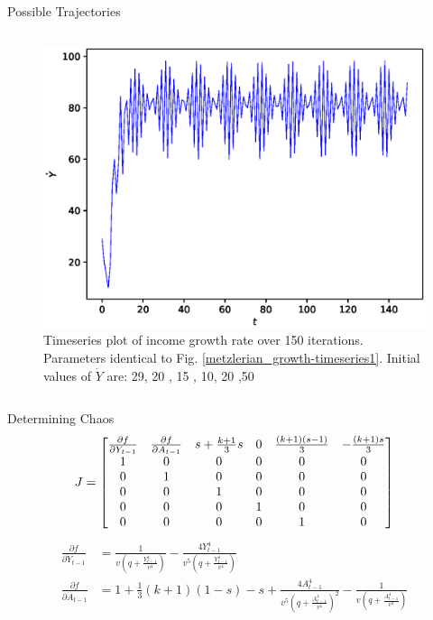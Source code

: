 \documentclass{beamer}
\begin{document}
\begin{frame}{Possible Trajectories}
\begin{columns}
\begin{column}{0.5\textwidth}
\begin{figure}
			\includegraphics[width=1.0\textwidth]{timeseries3.eps}
			\caption{Timeseries plot of income growth rate over 150 iterations. Parameters identical to Fig. \ref{metzlerian_growth-timeseries1}. Initial values of $\dot Y$ are: 29, 20 , 15 , 10, 20 ,50}
		\end{figure}
	\end{column}
	\end{columns}
\end{frame}

\begin{frame}{Determining Chaos}
	\begin{equation*}
		J=
		\begin{bmatrix}\small
			\frac{\partial f}{\partial Y_{t-1}} & \frac{\partial f}{\partial A_{t-1}} & s+\frac{k+1}{3}s & 0 & \frac{(k+1)(s-1)}{3} & -\frac{(k+1)s}{3}\\
			1 & 0 & 0 & 0 & 0 & 0\\
			0 & 1 & 0 & 0 & 0 & 0\\
			0 & 0 & 1 & 0 & 0 & 0\\
			0 & 0 & 0 & 1 & 0 & 0\\
			0 & 0 & 0 & 0 & 1 & 0
		\end{bmatrix}
	\end{equation*}
	\begin{align*}
		\frac{\partial f}{\partial \dot Y_{t-1}}&= \frac{1}{v\left(q+\frac{Y_{t-1}^4}{v^4}\right)}-\frac{4Y_{t-1}^4}{v^5\left(q+\frac{Y_{t-1}^4}{v^4}\right)}\\
		\frac{\partial f}{\partial \dot A_{t-1}}&=1+\frac{1}{3}(k+1)(1-s)-s+\frac{4A_{t-1}^4}{v^5\left(q+\frac{A_{t-1}^4}{v^4}\right)^2}-\frac{1}{v\left(q+\frac{A_{t-1}^4}{v^4}\right)}
	\end{align*}
\end{frame}
\end{document}
